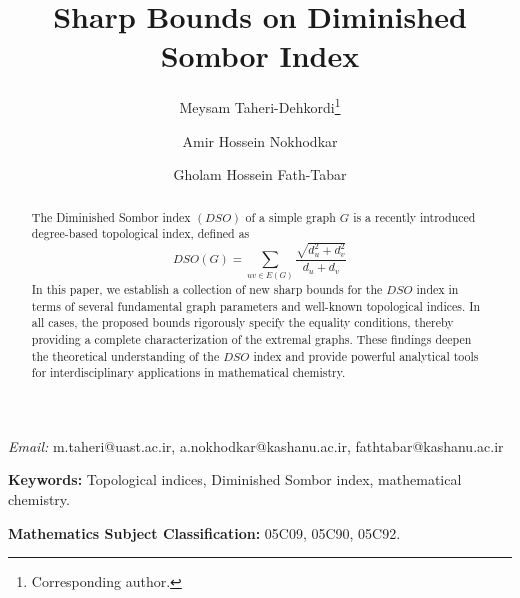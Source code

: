 \documentclass{article}
\theoremstyle{definition}
\begin{document}
\title { \textbf{Sharp Bounds on Diminished Sombor Index}}

\author[1]{Meysam Taheri-Dehkordi\thanks{Corresponding author.}}
\author[2]{Amir Hossein Nokhodkar}
\author[2]{Gholam Hossein Fath-Tabar}

\vspace{0.3cm}

\date{}
\maketitle

\vspace{-0.5cm}
\begin{center}
\footnotesize
\textit{Email:} {m.taheri@uast.ac.ir}, {a.nokhodkar@kashanu.ac.ir}, {fathtabar@kashanu.ac.ir}
\end{center}
\vspace{0.5cm}

\begin{abstract}
The Diminished Sombor index $(DSO)$ of a simple graph $G$ is a recently introduced degree-based topological index, defined as 
\[ 
DSO(G)=
\sum_{uv\in E(G)}
\frac{\sqrt{d_u^2+d_v^2}}
     {d_u+d_v}
\]
In this paper, we establish a collection of new sharp bounds for the $DSO$ index in terms of several fundamental graph parameters and well-known topological indices. In all cases, the proposed bounds rigorously specify the equality conditions, thereby providing a complete characterization of the extremal graphs. These findings deepen the theoretical understanding of the $DSO$ index and provide powerful analytical tools for interdisciplinary applications in mathematical chemistry.
\end{abstract}
\textbf{Keywords:}
Topological indices, Diminished Sombor index, mathematical chemistry. 

\textbf{Mathematics Subject Classification:}
05C09, 05C90, 05C92.
\end{document}
